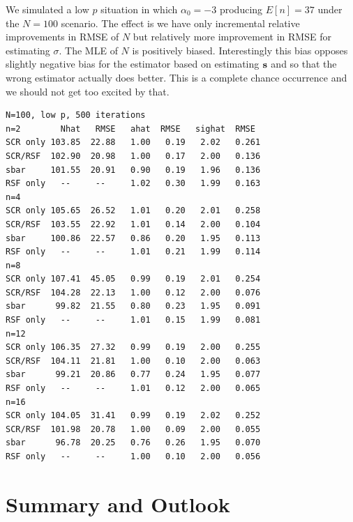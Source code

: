 We simulated a low $p$ situation in which $\alpha_{0}=-3$ producing
$E[n] = 37$ under the $N=100$ scenario.  The effect is we have only
incremental relative improvements in RMSE of $N$ but relatively more
improvement in RMSE for estimating $\sigma$. The MLE of
$N$ is positively biased.
Interestingly this bias opposes slightly negative bias for
the estimator based on estimating ${\bf s}$ and so that the wrong
estimator actually does better. This is a complete chance occurrence
and we should not get too excited by that.
{\small
\begin{verbatim}
N=100, low p, 500 iterations
n=2        Nhat   RMSE   ahat  RMSE   sighat  RMSE
SCR only 103.85  22.88   1.00   0.19   2.02   0.261
SCR/RSF  102.90  20.98   1.00   0.17   2.00   0.136
sbar     101.55  20.91   0.90   0.19   1.96   0.136
RSF only   --     --     1.02   0.30   1.99   0.163
n=4
SCR only 105.65  26.52   1.01   0.20   2.01   0.258
SCR/RSF  103.55  22.92   1.01   0.14   2.00   0.104
sbar     100.86  22.57   0.86   0.20   1.95   0.113
RSF only   --     --     1.01   0.21   1.99   0.114
n=8
SCR only 107.41  45.05   0.99   0.19   2.01   0.254
SCR/RSF  104.28  22.13   1.00   0.12   2.00   0.076
sbar      99.82  21.55   0.80   0.23   1.95   0.091
RSF only   --     --     1.01   0.15   1.99   0.081
n=12
SCR only 106.35  27.32   0.99   0.19   2.00   0.255
SCR/RSF  104.11  21.81   1.00   0.10   2.00   0.063
sbar      99.21  20.86   0.77   0.24   1.95   0.077
RSF only   --     --     1.01   0.12   2.00   0.065
n=16
SCR only 104.05  31.41   0.99   0.19   2.02   0.252
SCR/RSF  101.98  20.78   1.00   0.09   2.00   0.055
sbar      96.78  20.25   0.76   0.26   1.95   0.070
RSF only   --     --     1.00   0.10   2.00   0.056
\end{verbatim}
}

\section{Summary and Outlook}


